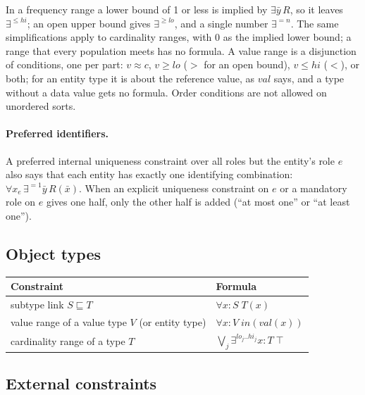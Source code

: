 \documentclass[11pt, a4paper]{article}
\newcommand{\val}{\mathit{val}}
\begin{document}
In a frequency range a lower bound of 1 or less is implied by
$\exists\bar y\,R$, so it leaves $\exists^{\le \mathit{hi}}$; an open upper bound gives
$\exists^{\ge\mathit{lo}}$, and a single number $\exists^{=n}$. The same
simplifications apply to cardinality ranges, with 0 as the implied lower
bound; a range that every population meets has no formula. A value range is
a disjunction of conditions, one per part: $v \approx c$, $v \ge
\mathit{lo}$ ($>$ for an open bound), $v \le \mathit{hi}$ ($<$), or both;
for an entity type it is about the reference value, as $\val$ says, and a
type without a data value gets no formula. Order conditions are not allowed
on unordered sorts.

\paragraph{Preferred identifiers.} A preferred internal uniqueness
constraint over all roles but the entity's role $e$ also says that each
entity has exactly one identifying combination:
$\forall x_e\,\exists^{=1}\bar y\,R(\bar x)$. When an explicit uniqueness
constraint on $e$ or a mandatory role on $e$ gives one half, only the other
half is added (``at most one'' or ``at least one'').

\subsection{Object types}

\begin{center}
\small
\begin{tabularx}{\textwidth}{l X}
\toprule
\textbf{Constraint} & \textbf{Formula} \\
\midrule
subtype link $S\sqsubseteq T$ & $\forall x{:}S\; T(x)$ \\
value range of a value type $V$ (or entity type) & $\forall x{:}V\; \mathit{in}(\val(x))$ \\
cardinality range of a type $T$ & $\bigvee_j \exists^{\mathit{lo}_j..\mathit{hi}_j} x{:}T\; \top$ \\
\bottomrule
\end{tabularx}
\end{center}

\subsection{External constraints}
\end{document}
